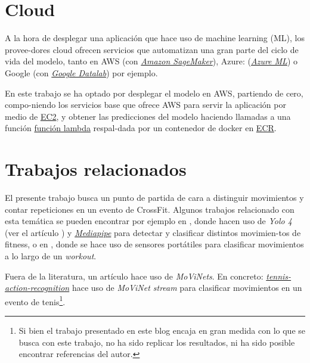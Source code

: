 \section{Cloud}

A la hora de desplegar una aplicación que hace uso de machine learning (ML), los provee-dores cloud ofrecen servicios que automatizan una gran parte del ciclo de vida del modelo, tanto en AWS (con \href{https://aws.amazon.com/sagemaker/?nc1=h_ls}{\textit{Amazon SageMaker}}), Azure: (\href{https://azure.microsoft.com/es-es/services/machine-learning/#product-overview}{\textit{Azure ML}}) o Google (con \href{https://cloud.google.com/datalab/docs}{\textit{Google Datalab}}) por ejemplo.

En este trabajo se ha optado por desplegar el modelo en AWS, partiendo de cero, compo-niendo los servicios base que ofrece AWS para servir la aplicación por medio de \href{https://aws.amazon.com/ec2/?nc1=h_ls}{EC2}, y obtener las predicciones del modelo haciendo llamadas a una función \href{https://aws.amazon.com/lambda/?nc1=h_ls}{función lambda} respal-dada por un contenedor de docker en \href{https://aws.amazon.com/ecr/?nc1=h_ls}{ECR}.

\section{Trabajos relacionados}

El presente trabajo busca un punto de partida de cara a distinguir movimientos y contar repeticiones en un evento de CrossFit. Algunos trabajos relacionado con esta temática se pueden encontrar por ejemplo en 
\cite{FitnessMovementTypes}, donde hacen uso de \textit{Yolo 4} (ver el artículo \cite{Yolo4}) y \href{https://mediapipe.dev/}{\textit{Mediapipe}} para detectar y clasificar distintos movimien-tos de fitness, o en \cite{ClassifyFunctionalFitness}, donde se hace uso de sensores portátiles para clasificar movimientos a lo largo de un \textit{workout}. 

Fuera de la literatura, un artículo hace uso de \textit{MoViNets}.
En concreto: \href{https://blog.ml6.eu/sports-video-analysis-in-the-real-world-realtime-tennis-action-recognition-using-movinet-stream-813200aa589f}{\textit{tennis-action-recognition}} hace uso de \textit{MoViNet stream} para clasificar movimientos en un evento de tenis\footnote{Si bien el trabajo presentado en este blog encaja en gran medida con lo que se busca con este trabajo, no ha sido replicar los resultados, ni ha sido posible encontrar referencias del autor.}.

